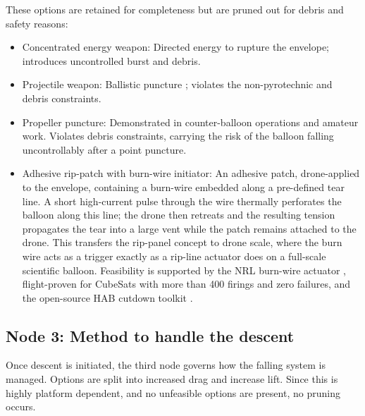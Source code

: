 These options are retained for completeness but are pruned out for debris and safety reasons:
\vspace{-8pt}
\begin{itemize}[leftmargin=*]

    \item Concentrated energy weapon: Directed energy to rupture the envelope; introduces uncontrolled burst and debris.

    \item Projectile weapon: Ballistic puncture \cite{Fortem}; violates the non-pyrotechnic and debris constraints.

    \item Propeller puncture: Demonstrated in counter-balloon operations \cite{Fortem} and amateur work. Violates debris constraints, carrying the risk of the balloon falling uncontrollably after a point puncture.


    \item Adhesive rip-patch with burn-wire initiator: An adhesive patch, drone-applied to the envelope, containing a burn-wire embedded along a pre-defined tear line. A short high-current pulse through the wire thermally perforates the balloon along this line; the drone then retreats and the resulting tension propagates the tear into a large vent while the patch remains attached to the drone. This transfers the rip-panel concept \cite{Yajima2009ScientificApplications} to drone scale, where the burn wire acts as a trigger exactly as a rip-line actuator does on a full-scale scientific balloon. Feasibility is supported by the NRL burn-wire actuator \cite{NRL2019}, flight-proven for CubeSats with more than 400 firings and zero failures, and the open-source HAB cutdown toolkit \cite{Clark2019AnPayloads}.

\end{itemize}
\vspace{-15pt}
\subsection{Node 3: Method to handle the descent}

Once descent is initiated, the third node governs how the falling system is managed. Options are split into increased drag and increase lift. Since this is highly platform dependent, and no unfeasible options are present, no pruning occurs.
\vspace{-10pt}
